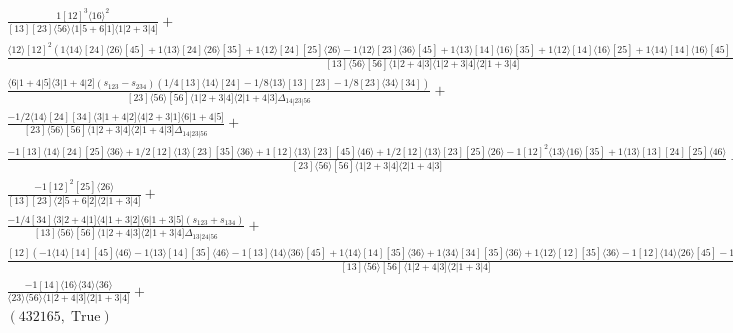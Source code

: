 \documentclass[varwidth, border=5pt]{standalone}
\begin{document}
\begin{my}
$\begin{gathered}
\scriptscriptstyle\frac{1[12]^3⟨16⟩^2}{[13][23]⟨56⟩⟨1|5+6|1]⟨1|2+3|4]}+\\
\scriptscriptstyle\frac{⟨12⟩[12]^2(1⟨14⟩[24]⟨26⟩[45]+1⟨13⟩[24]⟨26⟩[35]+1⟨12⟩[24][25]⟨26⟩-1⟨12⟩[23]⟨36⟩[45]+1⟨13⟩[14]⟨16⟩[35]+1⟨12⟩[14]⟨16⟩[25]+1⟨14⟩[14]⟨16⟩[45]+1⟨14⟩[34]⟨36⟩[45])}{[13]⟨56⟩[56]⟨1|2+4|3]⟨1|2+3|4]⟨2|1+3|4]}+\\
\scriptscriptstyle\frac{⟨6|1+4|5]⟨3|1+4|2](s_{123}-s_{234})(1/4[13]⟨14⟩[24]-1/8⟨13⟩[13][23]-1/8[23]⟨34⟩[34])}{[23]⟨56⟩[56]⟨1|2+3|4]⟨2|1+4|3]Δ_{14|23|56}}+\\
\scriptscriptstyle\frac{-1/2⟨14⟩[24][34]⟨3|1+4|2]⟨4|2+3|1]⟨6|1+4|5]}{[23]⟨56⟩[56]⟨1|2+3|4]⟨2|1+4|3]Δ_{14|23|56}}+\\
\scriptscriptstyle\frac{-1[13]⟨14⟩[24][25]⟨36⟩+1/2[12]⟨13⟩[23][35]⟨36⟩+1[12]⟨13⟩[23][45]⟨46⟩+1/2[12]⟨13⟩[23][25]⟨26⟩-1[12]^2⟨13⟩⟨16⟩[35]+1⟨13⟩[13][24][25]⟨46⟩}{[23]⟨56⟩[56]⟨1|2+3|4]⟨2|1+4|3]}+\\
\scriptscriptstyle\frac{-1[12]^2[25]⟨26⟩}{[13][23]⟨2|5+6|2]⟨2|1+3|4]}+\\
\scriptscriptstyle\frac{-1/4[34]⟨3|2+4|1]⟨4|1+3|2]⟨6|1+3|5](s_{123}+s_{134})}{[13]⟨56⟩[56]⟨1|2+4|3]⟨2|1+3|4]Δ_{13|24|56}}+\\
\scriptscriptstyle\frac{[12](-1⟨14⟩[14][45]⟨46⟩-1⟨13⟩[14][35]⟨46⟩-1[13]⟨14⟩⟨36⟩[45]+1⟨14⟩[14][35]⟨36⟩+1⟨34⟩[34][35]⟨36⟩+1⟨12⟩[12][35]⟨36⟩-1[12]⟨14⟩⟨26⟩[45]-1[12]⟨13⟩⟨26⟩[35])}{[13]⟨56⟩[56]⟨1|2+4|3]⟨2|1+3|4]}+\\
\scriptscriptstyle\frac{-1[14]⟨16⟩⟨34⟩⟨36⟩}{⟨23⟩⟨56⟩⟨1|2+4|3]⟨2|1+3|4]}+\\
\scriptscriptstyle(432165,\;\text{True})\phantom{+}
\end{gathered}$
\end{my}
\end{document}
